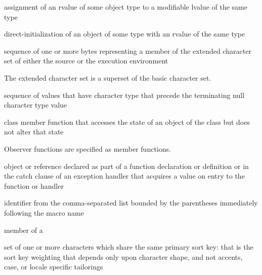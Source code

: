 %
assignment of an rvalue of some object type to a modifiable lvalue of the same type

%
direct-initialization of an object of some type with an rvalue of the same type

%
sequence of one or more bytes representing a member of the extended
character set of either the source or the execution environment

\begin{defnote}
The extended character set is a superset of the basic character
set.
\end{defnote}

%
%
sequence of values that have
character type
that precede the terminating null character type
value

%
class member function that accesses the state of an object of the class
but does not alter that state

\begin{defnote}
Observer functions are specified as
member functions.
\end{defnote}

%
%
%
 object or reference declared as part of a function declaration or
definition or in the catch clause of an exception handler that
acquires a value on entry to the function or handler

%
%
 identifier from
the comma-separated list bounded by the parentheses immediately
following the macro name

%
%
 member of a 

%
set of one or more characters which
share the same primary sort key: that is the sort key weighting that
depends only upon character shape, and not accents, case, or
locale specific tailorings


